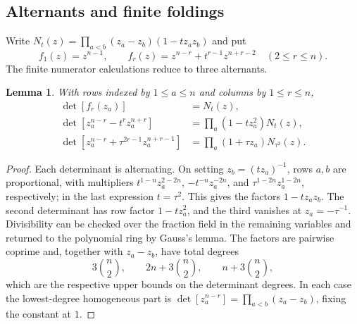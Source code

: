 \documentclass[12pt]{article}
\newtheorem{lemma}[theorem]{Lemma}
\numberwithin{equation}{section}
\begin{document}
\subsection{Alternants and finite foldings}

Write $N_t(z)=\prod_{a<b}(z_a-z_b)(1-tz_az_b)$ and put
\[
 f_1(z)=z^{n-1},\qquad
 f_r(z)=z^{n-r}+t^{r-1}z^{n+r-2}\quad(2\le r\le n).
\]
The finite numerator calculations reduce to three alternants.

\begin{lemma}
With rows indexed by $1\le a\le n$ and columns by $1\le r\le n$,
\begin{align}
 \det[f_r(z_a)]&=N_t(z),\label{eq:alternant-basic}\\
 \det[z_a^{n-r}-t^rz_a^{n+r}]
 &=\prod_a(1-tz_a^2)N_t(z),\label{eq:alternant-Ct}\\
 \det[z_a^{n-r}+\tau^{2r-1}z_a^{n+r-1}]
 &=\prod_a(1+\tau z_a)N_{\tau^2}(z).
 \label{eq:alternant-Bminus}
\end{align}
\end{lemma}

\begin{proof}
Each determinant is alternating.  On setting $z_b=(tz_a)^{-1}$,
rows $a,b$ are proportional, with multipliers
$t^{1-n}z_a^{2-2n}$, $-t^{-n}z_a^{-2n}$, and
$\tau^{1-2n}z_a^{1-2n}$, respectively; in the last expression
$t=\tau^2$.  This gives the factors $1-tz_az_b$.
The second determinant has row factor $1-tz_a^2$, and the third
vanishes at $z_a=-\tau^{-1}$.  Divisibility can be checked over the
fraction field in the remaining variables and returned to the polynomial
ring by Gauss's lemma.  The factors are pairwise coprime and,
together with $z_a-z_b$, have
total degrees
\[
 3\binom n2,\qquad 2n+3\binom n2,\qquad n+3\binom n2,
\]
which are the respective upper bounds on the determinant degrees.
In each case the lowest-degree homogeneous part is
$\det[z_a^{n-r}]=\prod_{a<b}(z_a-z_b)$, fixing the constant at $1$.
\end{proof}
\end{document}
